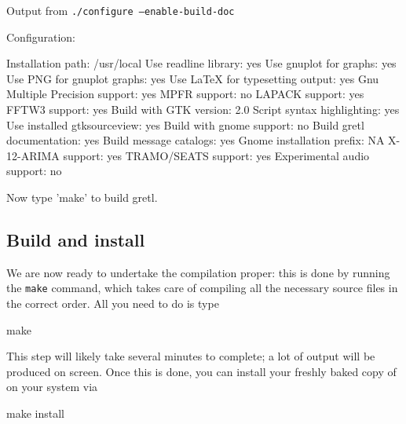 \begin{script}[htbp]
  \caption{Output from \texttt{./configure --enable-build-doc}}
  \label{configure-output}
\begin{scode}
Configuration:

  Installation path:                      /usr/local
  Use readline library:                   yes
  Use gnuplot for graphs:                 yes
  Use PNG for gnuplot graphs:             yes
  Use LaTeX for typesetting output:       yes
  Gnu Multiple Precision support:         yes
  MPFR support:                           no
  LAPACK support:                         yes
  FFTW3 support:                          yes
  Build with GTK version:                 2.0
  Script syntax highlighting:             yes
  Use installed gtksourceview:            yes
  Build with gnome support:               no
  Build gretl documentation:              yes
  Build message catalogs:                 yes
  Gnome installation prefix:              NA
  X-12-ARIMA support:                     yes
  TRAMO/SEATS support:                    yes
  Experimental audio support:             no

Now type 'make' to build gretl.
\end{scode}
\end{script}



\subsection{Build and install}

We are now ready to undertake the compilation proper: this is done by
running the \texttt{make} command, which takes care of compiling all
the necessary source files in the correct order. All you need to do is
type
\begin{code}
make 
\end{code}

This step will likely take several minutes to complete; a lot of
output will be produced on screen. Once this is done, you can install
your freshly baked copy of  on your system via
\begin{code}
make install
\end{code}

